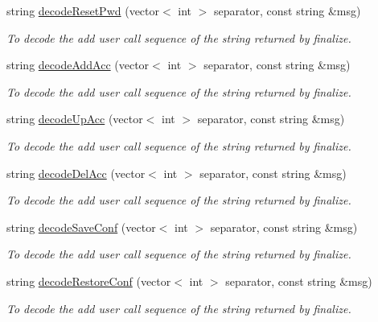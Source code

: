 \begin{DoxyCompactItemize}
string \hyperlink{classUMSMapper_a001ffc8295fb72cd937676973f0520cb}{decodeResetPwd} (vector$<$ int $>$ separator, const string \&msg)
\begin{DoxyCompactList}\small\item\em To decode the add user call sequence of the string returned by finalize. \item\end{DoxyCompactList}\item 
string \hyperlink{classUMSMapper_aad443517f273c610f3ecc38f9e9b817f}{decodeAddAcc} (vector$<$ int $>$ separator, const string \&msg)
\begin{DoxyCompactList}\small\item\em To decode the add user call sequence of the string returned by finalize. \item\end{DoxyCompactList}\item 
string \hyperlink{classUMSMapper_a7be83cb37c8b72e6103c62669381ac5c}{decodeUpAcc} (vector$<$ int $>$ separator, const string \&msg)
\begin{DoxyCompactList}\small\item\em To decode the add user call sequence of the string returned by finalize. \item\end{DoxyCompactList}\item 
string \hyperlink{classUMSMapper_a64e8fa1fe8aa071b405a4c1c67c837ec}{decodeDelAcc} (vector$<$ int $>$ separator, const string \&msg)
\begin{DoxyCompactList}\small\item\em To decode the add user call sequence of the string returned by finalize. \item\end{DoxyCompactList}\item 
string \hyperlink{classUMSMapper_a621d646f3f4525edb990813d31b2ee61}{decodeSaveConf} (vector$<$ int $>$ separator, const string \&msg)
\begin{DoxyCompactList}\small\item\em To decode the add user call sequence of the string returned by finalize. \item\end{DoxyCompactList}\item 
string \hyperlink{classUMSMapper_a26597d9d63ee7db4110669b59460f74f}{decodeRestoreConf} (vector$<$ int $>$ separator, const string \&msg)
\begin{DoxyCompactList}\small\item\em To decode the add user call sequence of the string returned by finalize. \item\end{DoxyCompactList}\item 

\end{DoxyCompactItemize}

